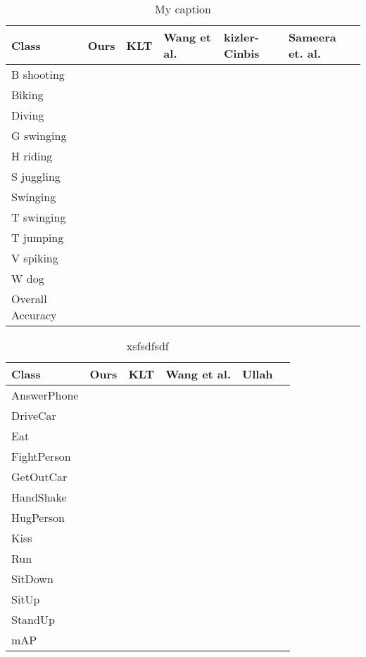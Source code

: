 \begin{table*}[]
\centering
\caption{My caption}
\label{my-label}
\begin{tabular}{|l||l|l|l|l|l|}
\hline
Class            & Ours & KLT & Wang et al. & kizler-Cinbis & Sameera et. al. \\ \hline  \hline
B shooting       &     &     &     &     &     \\ \hline
Biking           &     &     &     &     &     \\ \hline
Diving           &     &     &     &     &     \\ \hline
G swinging       &     &     &     &     &     \\ \hline
H riding         &     &     &     &     &     \\ \hline
S juggling       &     &     &     &     &     \\ \hline
Swinging         &     &     &     &     &     \\ \hline
T swinging       &     &     &     &     &     \\ \hline
T jumping        &     &     &     &     &     \\ \hline
V spiking        &     &     &     &     &     \\ \hline
W dog            &     &     &     &     &     \\ \hline \hline
Overall Accuracy &     &     &     &     &     \\ \hline
\end{tabular}
\end{table*}

\begin{table*}[]
\centering
\caption{xsfsdfsdf}
\label{my-label}
\begin{tabular}{|l|l|l|l|l|l|}
\hline
Class            & Ours & KLT & Wang et al. & Ullah   \\ \hline \hline
AnswerPhone       &     &     &     &         \\ 
DriveCar           &     &     &     &      \\ 
Eat           &     &     &     &          \\
FightPerson         &     &     &     &          \\ 
GetOutCar       &     &     &     &        \\ 
HandShake        &     &     &     &          \\ 
HugPerson       &     &     &     &          \\ 
Kiss        &     &     &     &          \\ 
Run        &     &     &     &          \\ 
SitDown           &     &     &     &          \\ 
SitUp           &     &     &     &          \\ 
StandUp           &     &     &     &          \\ \hline
mAP          &     &     &     &          \\ \hline
\end{tabular}
\end{table*}




